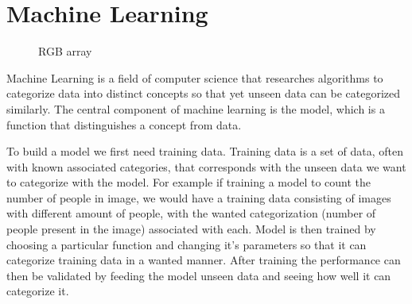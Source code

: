 \documentclass[12pt,a4paper,english
]{tunithesis}
\begin{document}
\section{Machine Learning}
\begin{figure}
  \centering
  \caption{RGB array}
  \label{fig:rgb-array}
\end{figure}

Machine Learning is a field of computer science that researches algorithms to categorize data into distinct concepts so that yet unseen data can be categorized similarly. The central component of machine learning is the model, which is a function that distinguishes a concept from data.

To build a model we first need training data. Training data is a set of data, often with known associated categories, that corresponds with the unseen data we want to categorize with the model. For example if training a model to count the number of people in image, we would have a training data consisting of images with different amount of people, with the wanted categorization (number of people present in the image) associated with each. Model is then trained by choosing a particular function and changing it's parameters so that it can categorize training data in a wanted manner. After training the performance can then be validated by feeding the model unseen data and seeing how well it can categorize it.
\end{document}
